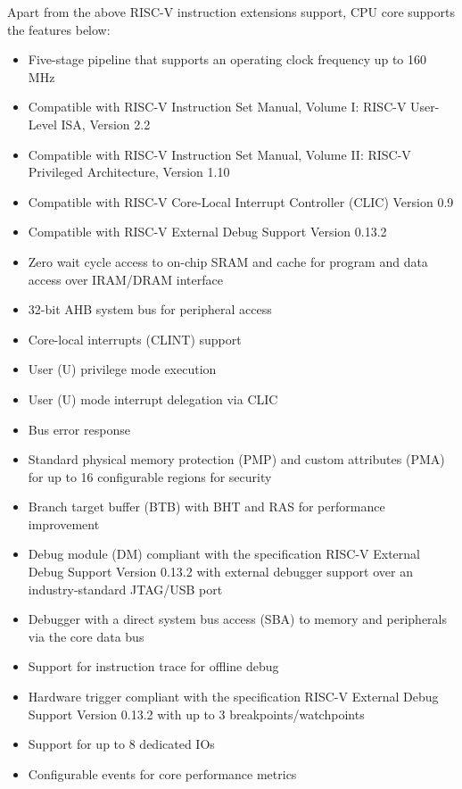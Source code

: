 \documentclass[main\_\_EN.tex]{subfiles}
\begin{document}
Apart from the above RISC-V instruction extensions support, CPU core supports the features below:
\begin{itemize}
    \item Five-stage pipeline that supports an operating clock frequency up to 160 MHz
    \item Compatible with RISC-V Instruction Set Manual, Volume I: RISC-V User-Level ISA, Version 2.2
    \item Compatible with RISC-V Instruction Set Manual, Volume II: RISC-V Privileged Architecture, Version 1.10
    \item Compatible with RISC-V Core-Local Interrupt Controller (CLIC) Version 0.9
    \item Compatible with RISC-V External Debug Support Version 0.13.2
    \item Zero wait cycle access to on-chip SRAM and cache for program and data access over IRAM/DRAM interface
    \item 32-bit AHB system bus for peripheral access
    \item Core-local interrupts (CLINT) support
    \item User (U) privilege mode execution
    \item User (U) mode interrupt delegation via CLIC
    \item Bus error response
    \item Standard physical memory protection (PMP) and custom attributes (PMA) for up to 16 configurable regions for security
    \item Branch target buffer (BTB) with BHT and RAS for performance improvement
    \item Debug module (DM) compliant with the specification RISC-V External Debug Support Version 0.13.2 with external debugger support over an industry-standard JTAG/USB port
    \item Debugger with a direct system bus access (SBA) to memory and peripherals via the core data bus
    \item Support for instruction trace for offline debug
    \item Hardware trigger compliant with the specification RISC-V External Debug Support Version 0.13.2 with up to 3 breakpoints/watchpoints
    \item Support for up to 8 dedicated IOs
    \item Configurable events for core performance metrics
\end{itemize}
\end{document}
